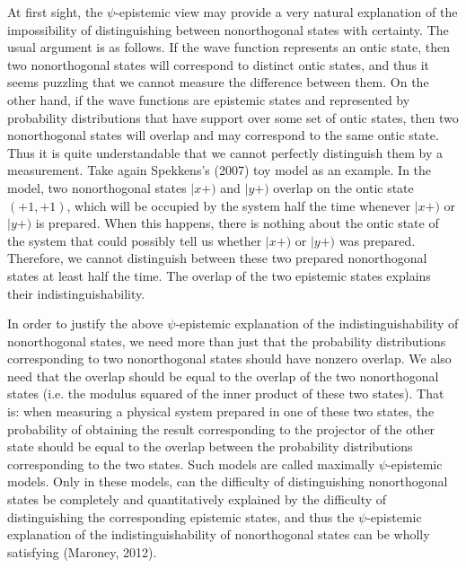 At first sight, the $\psi$-epistemic view may provide a very natural explanation of the impossibility of distinguishing between nonorthogonal states with certainty. The usual argument is as follows. If the wave function represents an ontic state, then two nonorthogonal states will correspond to distinct ontic states, and thus it seems puzzling that we cannot measure the difference between them. On the other hand, if the wave functions are epistemic states and represented by probability distributions that have support over some set of ontic states, then two nonorthogonal states will overlap and may correspond to the same ontic state. Thus it is quite understandable that we cannot perfectly distinguish them by a measurement. Take again Spekkens's (2007) toy model as an example. In the model, two nonorthogonal states $|x+)$ and $|y+)$ overlap on the ontic state $(+1, +1)$, which will be occupied by the system half the time whenever $|x+)$ or $|y+)$ is prepared. When this happens, there is nothing about the ontic state of the system that could possibly tell us whether $|x+)$ or $|y+)$ was prepared. Therefore, we cannot distinguish between these two prepared nonorthogonal states at least half the time. The overlap of the two epistemic states explains their indistinguishability.

In order to justify the above $\psi$-epistemic explanation of the indistinguishability of nonorthogonal states, we need more than just that the probability distributions corresponding to two nonorthogonal states should have nonzero overlap. We also need that the overlap should be equal to the overlap of the two nonorthogonal states (i.e. the modulus squared of the inner product of these two states). That is: when measuring a physical system prepared in one of these two states, the probability of obtaining the result corresponding to the projector of the other state should be equal to the overlap between the probability distributions corresponding to the two states. Such models are called maximally $\psi$-epistemic models. Only in these models, can the difficulty of distinguishing nonorthogonal states be completely and quantitatively explained by the difficulty of distinguishing the corresponding epistemic states, and thus the $\psi$-epistemic explanation of the indistinguishability of nonorthogonal states can be wholly satisfying (Maroney, 2012).

